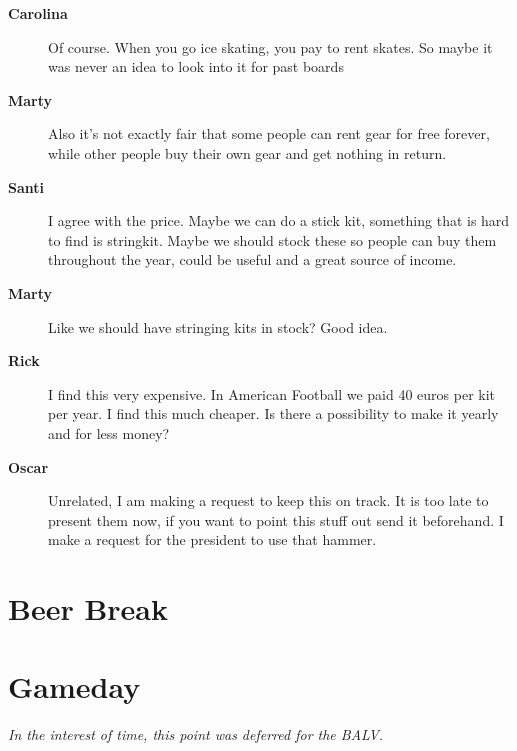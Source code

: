 \documentclass[12pt, a4paper]{article}
\newcommand{\speak}[2]{\begin{description}\item[\textbf{#1}]#2\end{description}}
\begin{document}
\speak{Carolina}{Of course. When you go ice skating, you pay to rent skates. So maybe it was never an idea to look into it for past boards}

\speak{Marty}{Also it's not exactly fair that some people can rent gear for free forever, while other people buy their own gear and get nothing in return.}



\speak{Santi}{I agree with the price. Maybe we can do a stick kit, something that is hard to find is stringkit. Maybe we should stock these so people can buy them throughout the year, could be useful and a great source of income.}

\speak{Marty}{Like we should have stringing kits in stock? Good idea.}

\speak{Rick}{I find this very expensive. In American Football we paid 40 euros per kit per year. I find this much cheaper. Is there a possibility to make it yearly and for less money?}

\speak{Oscar}{Unrelated, I am making a request to keep this on track. It is too late to present them now, if you want to point this stuff out send it beforehand. I make a request for the president to use that hammer.}





\section{Beer Break}

\section{Gameday}

\textit{In the interest of time, this point was deferred for the BALV.}
\end{document}
